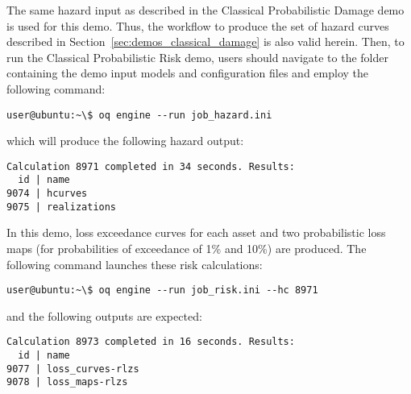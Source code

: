 The same hazard input as described in the Classical Probabilistic Damage demo
is used for this demo. Thus, the workflow to produce the set of hazard curves
described in Section~\ref{sec:demos_classical_damage} is also valid herein.
Then, to run the Classical Probabilistic Risk demo, users should navigate to
the folder containing the demo input models and configuration files and employ
the following command:

\begin{verbatim}
user@ubuntu:~\$ oq engine --run job_hazard.ini
\end{verbatim}

which will produce the following hazard output:

\begin{verbatim}
Calculation 8971 completed in 34 seconds. Results:
  id | name
9074 | hcurves
9075 | realizations
\end{verbatim}

In this demo, loss exceedance curves for each asset and two probabilistic loss
maps (for probabilities of exceedance of 1\% and 10\%) are produced. The
following command launches these risk calculations:

\begin{verbatim}
user@ubuntu:~\$ oq engine --run job_risk.ini --hc 8971
\end{verbatim}

and the following outputs are expected:

\begin{verbatim}
Calculation 8973 completed in 16 seconds. Results:
  id | name
9077 | loss_curves-rlzs
9078 | loss_maps-rlzs
\end{verbatim}
